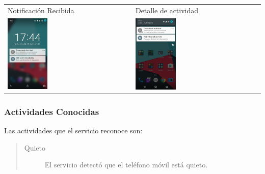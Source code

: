 {\begin{table}[h]
\begin{tabular}{ll}
\textsf{\relax 
Notificación Recibida
} & \textsf{\relax 
Detalle de actividad
}\\
    {\includegraphics[width=0.33\textwidth]{anexos/graphics/scr_notification.jpg}}
 & 
    {\includegraphics[width=0.33\textwidth]{anexos/graphics/bar_notification2.jpg}}
\\
\end{tabular}
\end{table}



\subsubsection{Actividades Conocidas}
\label{contrib:actividades-conocidas}
Las actividades que el servicio reconoce son:
\begin{quote}
\begin{description}
\item[{Quieto}] \leavevmode
El servicio detectó que el teléfono móvil está quieto.


\end{description}
\end{quote}}
